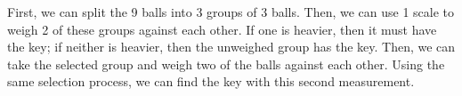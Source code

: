 \documentclass[answers]{exam}
\begin{document}
\begin{questions}
\begin{solution}
First, we can split the 9 balls into 3 groups of 3 balls. Then, we can use 1 scale to weigh 2 of these groups against each other. If one is heavier, then it must have the key; if neither is heavier, then the unweighed group has the key. Then, we can take the selected group and weigh two of the balls against each other. Using the same selection process, we can find the key with this second measurement.
\end{solution}

\end{questions}
\end{document}
